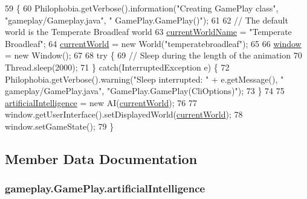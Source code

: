 \begin{DoxyCode}
59                                            \{
60         Philophobia.getVerbose().information(\textcolor{stringliteral}{"Creating GamePlay class"}, \textcolor{stringliteral}{"gameplay/Gameplay.java"}, \textcolor{stringliteral}{"
      GamePlay.GamePlay()"});
61 
62         \textcolor{comment}{// The default world is the Temperate Broadleaf world}
63         \hyperlink{a00010_adcc37bdd0470d8adc27fa249d93adcff}{currentWorldName} = \textcolor{stringliteral}{"Temperate Broadleaf"};
64         \hyperlink{a00010_acac96730473a405274e9ff0a58e4d77e}{currentWorld} = \textcolor{keyword}{new} World(\textcolor{stringliteral}{"temperatebroadleaf"});
65 
66         \hyperlink{a00010_aed3cc7a8f5e4838bb0b37d4014c6133e}{window} = \textcolor{keyword}{new} Window();
67 
68         \textcolor{keywordflow}{try} \{
69             \textcolor{comment}{// Sleep during the length of the animation}
70             Thread.sleep(2000);
71         \} \textcolor{keywordflow}{catch}(InterruptedException e) \{
72             Philophobia.getVerbose().warning(\textcolor{stringliteral}{"Sleep interrupted: "} + e.getMessage(), \textcolor{stringliteral}{"
      gameplay/GamePlay.java"}, \textcolor{stringliteral}{"GamePlay.GamePlay(CliOptions)"});
73         \}
74 
75         \hyperlink{a00010_a416406c147a47ba292990aa11064d9aa}{artificialIntelligence} = \textcolor{keyword}{new} AI(\hyperlink{a00010_acac96730473a405274e9ff0a58e4d77e}{currentWorld});
76 
77         window.getUserInterface().setDisplayedWorld(\hyperlink{a00010_acac96730473a405274e9ff0a58e4d77e}{currentWorld});
78         window.setGameState();
79     \}
\end{DoxyCode}


\subsection{Member Data Documentation}
\hypertarget{a00010_a416406c147a47ba292990aa11064d9aa}{
\subsubsection[{artificial\-Intelligence}]{ gameplay.\-Game\-Play.\-artificial\-Intelligence\hspace{0.3cm}{\ttfamily [protected]}}}\label{a00010_a416406c147a47ba292990aa11064d9aa}


